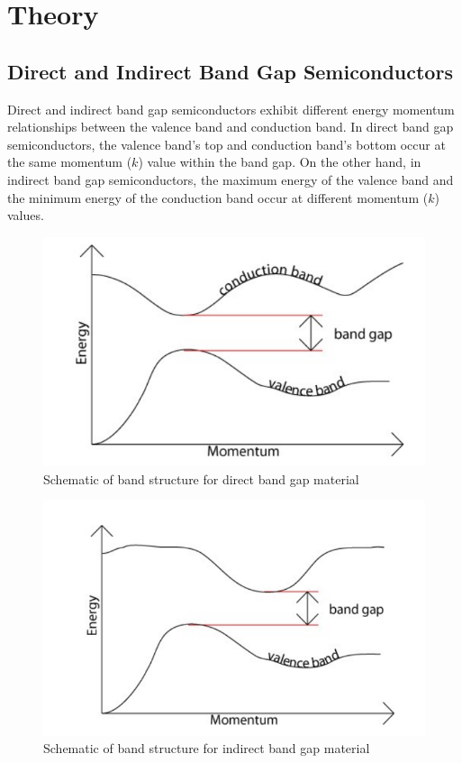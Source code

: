 \section{Theory}
	\subsection{Direct and Indirect Band Gap Semiconductors}
		Direct and indirect band gap semiconductors exhibit different energy momentum relationships between the valence band and conduction band. In direct band gap semiconductors, the valence band's top and conduction band's bottom occur at the same momentum ($k$) value within the band gap. On the other hand, in indirect band gap semiconductors, the maximum energy of the valence band and the minimum energy of the conduction band occur at different momentum ($k$) values. 
		\begin{figure}[H]
			\centering
			\includegraphics[width=0.8\columnwidth]{images/ut1.png}
			\caption{ Schematic of band structure for direct band gap material }
			\label{th:1}
		\end{figure}
		\begin{figure}[H]
			\centering
			\includegraphics[width=0.8\columnwidth]{images/ut2.png}
			\caption{ Schematic of band structure for indirect band gap material }
			\label{th:2}
		\end{figure}

